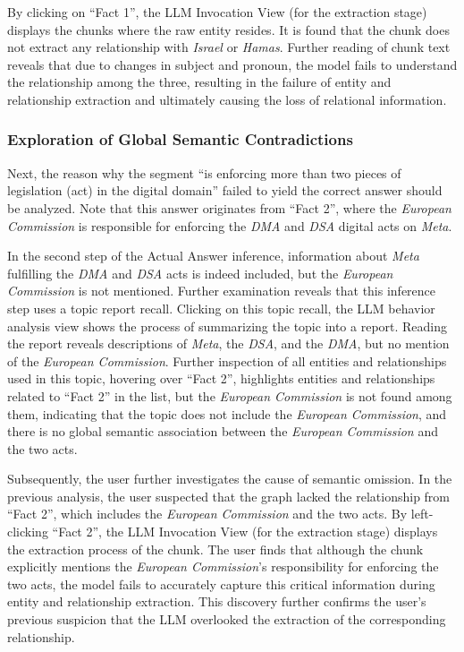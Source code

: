 By clicking on ``Fact 1'', the LLM Invocation View (for the extraction stage) displays the chunks where the raw entity resides. It is found that the chunk does not extract any relationship with \textit{Israel} or \textit{Hamas}. Further reading of chunk text reveals that due to changes in subject and pronoun, the model fails to understand the relationship among the three, resulting in the failure of entity and relationship extraction and ultimately causing the loss of relational information.

\subsubsection{Exploration of Global Semantic Contradictions}

Next, the reason why the segment ``is enforcing more than two pieces of legislation (act) in the digital domain'' failed to yield the correct answer should be analyzed. Note that this answer originates from ``Fact 2'', where the \textit{European Commission} is responsible for enforcing the \textit{DMA} and \textit{DSA} digital acts on \textit{Meta}.

In the second step of the Actual Answer inference, information about \textit{Meta} fulfilling the \textit{DMA} and \textit{DSA} acts is indeed included, but the \textit{European Commission} is not mentioned. Further examination reveals that this inference step uses a topic report recall. Clicking on this topic recall, the LLM behavior analysis view shows the process of summarizing the topic into a report. Reading the report reveals descriptions of \textit{Meta}, the \textit{DSA}, and the \textit{DMA}, but no mention of the \textit{European Commission}. Further inspection of all entities and relationships used in this topic, hovering over ``Fact 2'', highlights entities and relationships related to ``Fact 2'' in the list, but the \textit{European Commission} is not found among them, indicating that the topic does not include the \textit{European Commission}, and there is no global semantic association between the \textit{European Commission} and the two acts.

Subsequently, the user further investigates the cause of semantic omission. In the previous analysis, the user suspected that the graph lacked the relationship from ``Fact 2'', which includes the \textit{European Commission} and the two acts. By left-clicking ``Fact 2'', the LLM Invocation View (for the extraction stage) displays the extraction process of the chunk. The user finds that although the chunk explicitly mentions the \textit{European Commission}'s responsibility for enforcing the two acts, the model fails to accurately capture this critical information during entity and relationship extraction. This discovery further confirms the user's previous suspicion that the LLM overlooked the extraction of the corresponding relationship.

